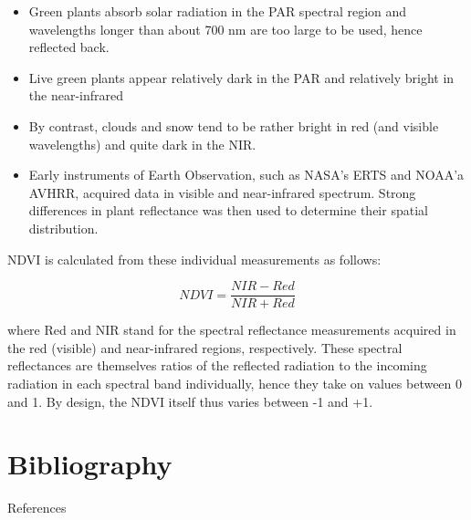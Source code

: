 \documentclass[11pt,dvipsnames,ignorenonframetext,aspectratio=169]{beamer}
\providecommand{\tightlist}{%
  \setlength{\itemsep}{0pt}\setlength{\parskip}{0pt}}
\begin{document}
\begin{frame}{}
\protect\hypertarget{section-8}{}
\begin{itemize}
\tightlist
\item
  Green plants absorb solar radiation in the PAR spectral region and
  wavelengths longer than about 700 nm are too large to be used, hence
  reflected back.
\item
  Live green plants appear relatively dark in the PAR and relatively
  bright in the near-infrared
\item
  By contrast, clouds and snow tend to be rather bright in red (and
  visible wavelengths) and quite dark in the NIR.
\item
  Early instruments of Earth Observation, such as NASA's ERTS and NOAA'a
  AVHRR, acquired data in visible and near-infrared spectrum. Strong
  differences in plant reflectance was then used to determine their
  spatial distribution.
\end{itemize}
\end{frame}

\begin{frame}{}
\protect\hypertarget{section-9}{}
NDVI is calculated from these individual measurements as follows:

\[
NDVI = \frac{NIR - Red}{NIR + Red}
\]

where Red and NIR stand for the spectral reflectance measurements
acquired in the red (visible) and near-infrared regions, respectively.
These spectral reflectances are themselves ratios of the reflected
radiation to the incoming radiation in each spectral band individually,
hence they take on values between 0 and 1. By design, the NDVI itself
thus varies between -1 and +1.
\end{frame}

\hypertarget{bibliography}{%
\section{Bibliography}\label{bibliography}}

\begin{frame}{References}
\protect\hypertarget{references}{}
\end{frame}
\end{document}
